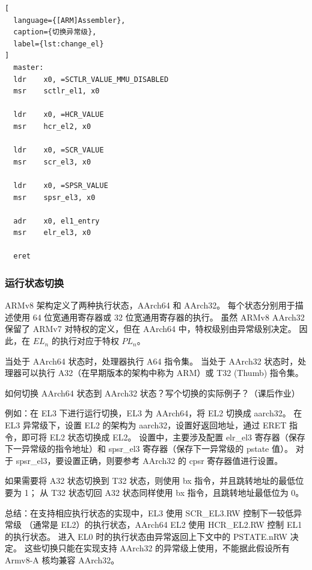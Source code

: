 \begin{lstlisting}[
  language={[ARM]Assembler},
  caption={切换异常级},
  label={lst:change_el}
]
  master:
  ldr    x0, =SCTLR_VALUE_MMU_DISABLED
  msr    sctlr_el1, x0

  ldr    x0, =HCR_VALUE
  msr    hcr_el2, x0

  ldr    x0, =SCR_VALUE
  msr    scr_el3, x0

  ldr    x0, =SPSR_VALUE
  msr    spsr_el3, x0

  adr    x0, el1_entry
  msr    elr_el3, x0

  eret
\end{lstlisting}

\subsubsection{运行状态切换}

ARMv8 架构定义了两种执行状态，AArch64 和 AArch32。
每个状态分别用于描述使用 64 位宽通用寄存器或 32 位宽通用寄存器的执行。
虽然 ARMv8 AArch32 保留了 ARMv7 对特权的定义，但在 AArch64 中，特权级别由异常级别决定。
因此，在 $EL_n$ 的执行对应于特权 $PL_n$。

当处于 AArch64 状态时，处理器执行 A64 指令集。
当处于 AArch32 状态时，处理器可以执行 A32（在早期版本的架构中称为 ARM）或 T32 (Thumb) 指令集。

\begin{probsolu}[title={Problem and Solution \theprob}]{
    如何切换 AArch64 状态到 AArch32 状态？写个切换的实际例子？（课后作业）
  }\label{pb:state_changing}
  
  例如：在 EL3 下进行运行切换，EL3 为 AArch64，将 EL2 切换成 aarch32。
  在 EL3 异常级下，设置 EL2 的架构为 aarch32，设置好返回地址，通过 ERET 指令，即可将 EL2 状态切换成 EL2。
  设置中，主要涉及配置 elr\_el3 寄存器（保存下一异常级的指令地址）和 spsr\_el3 寄存器（保存下一异常级的 pstate 值）。
  对于 spsr\_el3，要设置正确，则要参考 AArch32 的 cpsr 寄存器值进行设置。

  如果需要将 A32 状态切换到 T32 状态，则使用 bx 指令，并且跳转地址的最低位要为 1；
  从 T32 状态切回 A32 状态同样使用 bx 指令，且跳转地址最低位为 0。
  
  总结：在支持相应执行状态的实现中，EL3 使用 SCR\_EL3.RW 控制下一较低异常级
  （通常是 EL2）的执行状态，AArch64 EL2 使用 HCR\_EL2.RW 控制 EL1 的执行状态。
  进入 EL0 时的执行状态由异常返回上下文中的 PSTATE.nRW 决定。
  这些切换只能在实现支持 AArch32 的异常级上使用，不能据此假设所有 Armv8-A 核均兼容 AArch32。
\end{probsolu}
